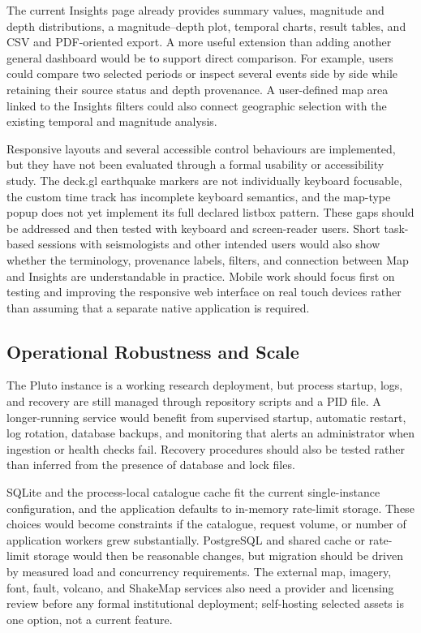 \documentclass[12pt]{article}
\begin{document}
The current Insights page already provides summary values, magnitude and depth distributions, a magnitude--depth plot, temporal charts, result tables, and CSV and PDF-oriented export. A more useful extension than adding another general dashboard would be to support direct comparison. For example, users could compare two selected periods or inspect several events side by side while retaining their source status and depth provenance. A user-defined map area linked to the Insights filters could also connect geographic selection with the existing temporal and magnitude analysis.

Responsive layouts and several accessible control behaviours are implemented, but they have not been evaluated through a formal usability or accessibility study. The deck.gl earthquake markers are not individually keyboard focusable, the custom time track has incomplete keyboard semantics, and the map-type popup does not yet implement its full declared listbox pattern. These gaps should be addressed and then tested with keyboard and screen-reader users. Short task-based sessions with seismologists and other intended users would also show whether the terminology, provenance labels, filters, and connection between Map and Insights are understandable in practice. Mobile work should focus first on testing and improving the responsive web interface on real touch devices rather than assuming that a separate native application is required.

\subsection{Operational Robustness and Scale}

The Pluto instance is a working research deployment, but process startup, logs, and recovery are still managed through repository scripts and a PID file. A longer-running service would benefit from supervised startup, automatic restart, log rotation, database backups, and monitoring that alerts an administrator when ingestion or health checks fail. Recovery procedures should also be tested rather than inferred from the presence of database and lock files.

SQLite and the process-local catalogue cache fit the current single-instance configuration, and the application defaults to in-memory rate-limit storage. These choices would become constraints if the catalogue, request volume, or number of application workers grew substantially. PostgreSQL and shared cache or rate-limit storage would then be reasonable changes, but migration should be driven by measured load and concurrency requirements. The external map, imagery, font, fault, volcano, and ShakeMap services also need a provider and licensing review before any formal institutional deployment; self-hosting selected assets is one option, not a current feature.
\end{document}
